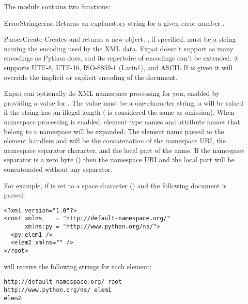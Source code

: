 The  module contains two functions:

\begin{funcdesc}{ErrorString}{errno}
Returns an explanatory string for a given error number .
\end{funcdesc}

\begin{funcdesc}{ParserCreate}{}
Creates and returns a new  object.  
, if specified, must be a string naming the encoding 
used by the XML data.  Expat doesn't support as many encodings as
Python does, and its repertoire of encodings can't be extended; it
supports UTF-8, UTF-16, ISO-8859-1 (Latin1), and ASCII.  If
 is given it will override the implicit or explicit
encoding of the document.

Expat can optionally do XML namespace processing for you, enabled by
providing a value for .  The value must be a
one-character string; a  will be raised if the
string has an illegal length ( is considered the same as
omission).  When namespace processing is enabled, element type names
and attribute names that belong to a namespace will be expanded.  The
element name passed to the element handlers
 and 
will be the concatenation of the namespace URI, the namespace
separator character, and the local part of the name.  If the namespace
separator is a zero byte () then the namespace URI and
the local part will be concatenated without any separator.

For example, if  is set to a space character
(\character{ }) and the following document is parsed:

\begin{verbatim}
<?xml version="1.0"?>
<root xmlns    = "http://default-namespace.org/"
      xmlns:py = "http://www.python.org/ns/">
  <py:elem1 />
  <elem2 xmlns="" />
</root>
\end{verbatim}

 will receive the following strings
for each element:

\begin{verbatim}
http://default-namespace.org/ root
http://www.python.org/ns/ elem1
elem2
\end{verbatim}
\end{funcdesc}


